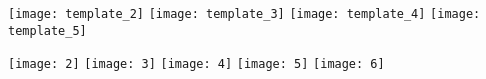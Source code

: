 \documentclass[varwidth=7in]{standalone}
\begin{document}
\raggedright

%
\texttt{[image: template\_2]}%
\texttt{[image: template\_3]}%
\texttt{[image: template\_4]}%
\texttt{[image: template\_5]}%

%
\texttt{[image: 2]}%
\texttt{[image: 3]}%
\texttt{[image: 4]}%
\texttt{[image: 5]}%
\texttt{[image: 6]}%
\end{document}

